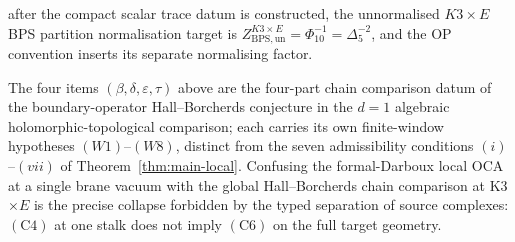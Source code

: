 \begin{rmk}
\begin{itemize}
        after the compact scalar trace datum is constructed, the
        unnormalised \(K3\times E\) BPS partition normalisation target is
        \(Z^{K3\times E}_{\mathrm{BPS,un}}=\Phi_{10}^{-1}
        =\Delta_5^{-2}\), and the OP convention inserts its separate
        normalising factor.
\end{itemize}
The four items \((\beta,\delta,\varepsilon,\tau)\) above are the
four-part chain comparison datum of the boundary-operator
Hall--Borcherds conjecture in the \(d=1\) algebraic
holomorphic-topological comparison;
each carries its own finite-window hypotheses \((W1)\)--\((W8)\),
distinct from the
seven admissibility conditions \((i)\)--\((vii)\) of
Theorem~\ref{thm:main-local}.  Confusing the formal-Darboux local
\(\mathrm{OCA}\) at a single brane vacuum with the global Hall--Borcherds
chain comparison at K3\(\times E\) is the precise collapse forbidden by
the typed separation of source complexes: \(\mathrm{(C4)}\) at one stalk does
not imply \(\mathrm{(C6)}\) on the full target geometry.
\end{rmk}
